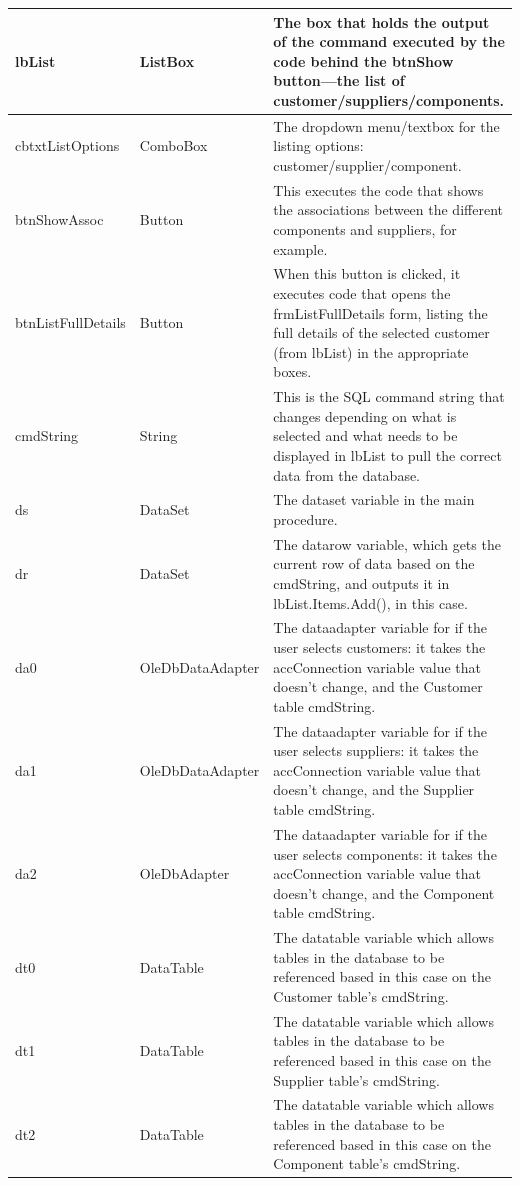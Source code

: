 \begin{longtable}{| p{4cm} | p{3cm} | p{10cm} |}
		lbList & ListBox & The box that holds the output of the command executed by the code behind the btnShow button---the list of customer\slash suppliers\slash components.\\
		\hline
		cbtxtListOptions & ComboBox & The dropdown menu\slash textbox for the listing options: customer\slash supplier\slash component.\\
		\hline
		btnShowAssoc & Button & This executes the code that shows the associations between the different components and suppliers, for example.\\
		\hline
		btnListFullDetails & Button & When this button is clicked, it executes code that opens the frmListFullDetails form, listing the full details of the selected customer (from lbList) in the appropriate boxes.\\
		\hline
		cmdString & String & This is the SQL command string that changes depending on what is selected and what needs to be displayed in lbList to pull the correct data from the database.\\
		\hline
		ds & DataSet & The dataset variable in the main procedure.\\
		\hline
		dr & DataSet & The datarow variable, which gets the current row of data based on the cmdString, and outputs it in lbList.Items.Add(), in this case.\\
		\hline
		da0 & OleDbDataAdapter & The dataadapter variable for if the user selects customers: it takes the accConnection variable value that doesn't change, and the Customer table cmdString.\\
		\hline
		da1 & OleDbDataAdapter & The dataadapter variable for if the user selects suppliers: it takes the accConnection variable value that doesn't change, and the Supplier table cmdString.\\
		\hline
		da2 & OleDbAdapter & The dataadapter variable for if the user selects components: it takes the accConnection variable value that doesn't change, and the Component table cmdString.\\
		\hline
		dt0 & DataTable & The datatable variable which allows tables in the database to be referenced based in this case on the Customer table's cmdString.\\
		\hline
		dt1 & DataTable & The datatable variable which allows tables in the database to be referenced based in this case on the Supplier table's cmdString.\\
		\hline
		dt2 & DataTable & The datatable variable which allows tables in the database to be referenced based in this case on the Component table's cmdString.\\

\end{longtable}
